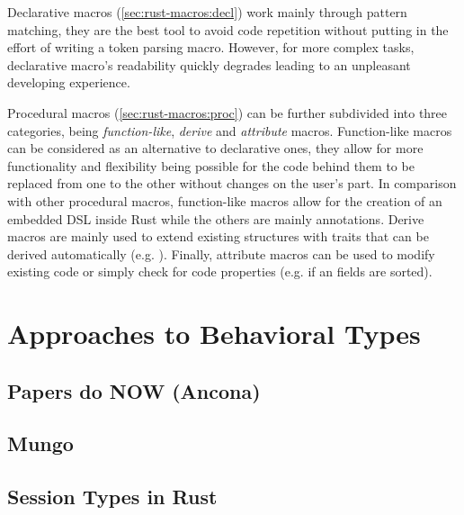 Declarative macros (\autoref{sec:rust-macros:decl}) work mainly through pattern matching,
they are the best tool to avoid code repetition without putting in the effort of writing a token parsing macro.
However, for more complex tasks, declarative macro's readability quickly degrades leading to an unpleasant developing experience.

Procedural macros (\autoref{sec:rust-macros:proc}) can be further subdivided into three categories,
being \emph{function-like}, \emph{derive} and \emph{attribute} macros.
Function-like macros can be considered as an alternative to declarative ones,
they allow for more functionality and flexibility being possible for the code behind them
to be replaced from one to the other without changes on the user's part.
In comparison with other procedural macros, function-like macros allow for the creation of an embedded DSL inside Rust while the others are mainly annotations.
Derive macros are mainly used to extend existing structures with traits that can be derived automatically (e.g. ).
Finally, attribute macros can be used to modify existing code or simply check for code properties (e.g. if an  fields are sorted).

\section{Approaches to Behavioral Types}\label{sec:behavioral-approaches}

\subsection{Papers do NOW (Ancona)}

\subsection{Mungo}

\subsection{Session Types in Rust}